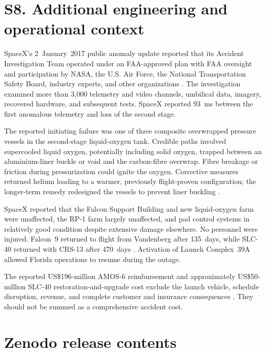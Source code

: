 \documentclass[]{seismica}
\begin{document}
\FloatBarrier

\section*{S8. Additional engineering and operational context}
\label{sec:supp_engineering}

SpaceX's 2~January~2017 public anomaly update reported that its Accident
Investigation Team operated under an FAA-approved plan with FAA oversight and
participation by NASA, the U.S. Air Force, the National Transportation Safety
Board, industry experts, and other organizations
\citep{spacex_anomaly_2017,nasa_sma_falcon9}. The investigation examined more
than 3,000 telemetry and video channels, umbilical data, imagery, recovered
hardware, and subsequent tests. SpaceX reported 93~ms between the first
anomalous telemetry and loss of the second stage.

The reported initiating failure was one of three composite overwrapped pressure
vessels in the second-stage liquid-oxygen tank. Credible paths involved
supercooled liquid oxygen, potentially including solid oxygen, trapped between
an aluminium-liner buckle or void and the carbon-fibre overwrap. Fibre breakage
or friction during pressurization could ignite the oxygen. Corrective measures
returned helium loading to a warmer, previously flight-proven configuration;
the longer-term remedy redesigned the vessels to prevent liner buckling
\citep{spacex_anomaly_2017}.

SpaceX reported that the Falcon Support Building and new liquid-oxygen farm
were unaffected, the RP-1 farm largely unaffected, and pad control systems in
relatively good condition despite extensive damage elsewhere. No personnel
were injured. Falcon~9 returned to flight from Vandenberg after 135~days, while
SLC-40 returned with CRS-13 after 470~days
\citep{spacex_iridium1_2017,spacex_crs13_2017}. Activation of Launch
Complex~39A allowed Florida operations to resume during the outage.

The reported US\$196-million AMOS-6 reimbursement and approximately
US\$50-million SLC-40 restoration-and-upgrade cost exclude the launch vehicle,
schedule disruption, revenue, and complete customer and insurance consequences
\citep{magan_amos6_2016,clark_slc40_2017}. They should not be summed as a
comprehensive accident cost.

\section*{Zenodo release contents}
\end{document}
